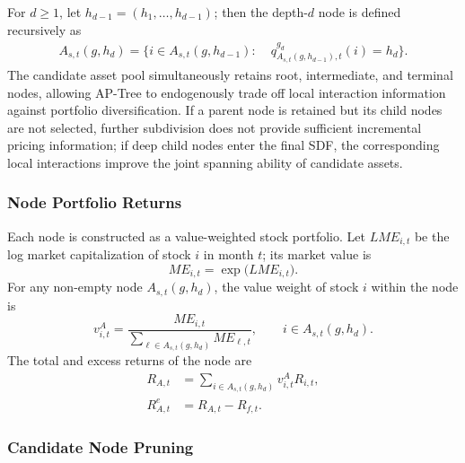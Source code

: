 \documentclass[12pt]{article}
\def\bm#1{#1}%
\def\mathrm#1{#1}%
\def\top{}%
\begin{document}
For \(d\geq1\), let
\(\bm h_{d-1}=(h_1,\ldots,h_{d-1})^{\top}\); then the depth-\(d\) node is defined recursively as
\begin{equation}
  \begin{aligned}
  A_{s,t}(\bm g,\bm h_d)
  =\bigl\{i\in
    A_{s,t}(\bm g,\bm h_{d-1}):\;&
    q_{A_{s,t}(\bm g,\bm h_{d-1}),t}^{g_d}(i)
    =h_d
  \bigr\}.
  \end{aligned}
  \label{eq:recursive_node}
\end{equation}
The candidate asset pool simultaneously retains root, intermediate, and terminal nodes, allowing AP-Tree to endogenously trade off local interaction information against portfolio diversification. If a parent node is retained but its child nodes are not selected, further subdivision does not provide sufficient incremental pricing information; if deep child nodes enter the final SDF, the corresponding local interactions improve the joint spanning ability of candidate assets.

\subsubsection{Node Portfolio Returns}

Each node is constructed as a value-weighted stock portfolio. Let \(\mathrm{LME}_{i,t}\) be the log market capitalization of stock \(i\) in month \(t\); its market value is
\begin{equation}
  \mathrm{ME}_{i,t}
  =
  \exp\bigl(\mathrm{LME}_{i,t}\bigr).
  \label{eq:recover_market_cap}
\end{equation}
For any non-empty node \(A_{s,t}(\bm g,\bm h_d)\), the value weight of stock \(i\) within the node is
\begin{equation}
  v_{i,t}^{A}
  =
  \frac{\mathrm{ME}_{i,t}}
       {\displaystyle
        \sum_{\ell\in A_{s,t}(\bm g,\bm h_d)}
        \mathrm{ME}_{\ell,t}},
  \qquad
  i\in A_{s,t}(\bm g,\bm h_d).
  \label{eq:node_stock_weight}
\end{equation}
The total and excess returns of the node are
\begin{align}
  R_{A,t}
  &=
  \sum_{i\in A_{s,t}(\bm g,\bm h_d)}
  v_{i,t}^{A}R_{i,t},
  \label{eq:node_return}\\
  R_{A,t}^{e}
  &=R_{A,t}-R_{f,t}.
  \label{eq:node_excess_return}
\end{align}

\subsubsection{Candidate Node Pruning}
\end{document}
